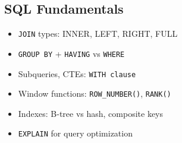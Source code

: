 \documentclass[12pt,a4paper]{article}
\begin{document}
\subsection{SQL Fundamentals}
\begin{itemize}
  \item \texttt{JOIN} types: INNER, LEFT, RIGHT, FULL
  \item \texttt{GROUP BY} + \texttt{HAVING} vs \texttt{WHERE}
  \item Subqueries, CTEs: \texttt{WITH clause}
  \item Window functions: \texttt{ROW\_NUMBER()}, \texttt{RANK()}
  \item Indexes: B-tree vs hash, composite keys
  \item \texttt{EXPLAIN} for query optimization
\end{itemize}
\end{document}
